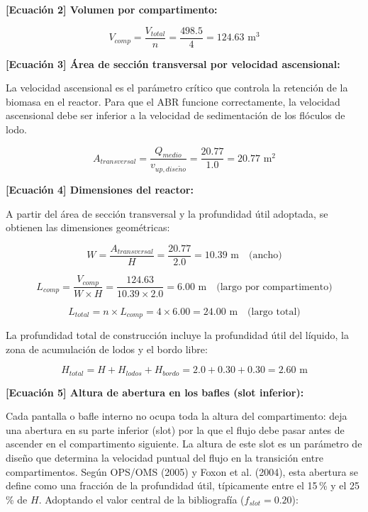 \documentclass[12pt,a4paper]{article}
\begin{document}
\textbf{[Ecuación 2] Volumen por compartimento:}

\begin{equation}
V_{comp} = \frac{V_{total}}{n} = \frac{498.5}{4} = 124.63 \text{ m}^3
\end{equation}

\textbf{[Ecuación 3] Área de sección transversal por velocidad ascensional:}

La velocidad ascensional es el parámetro crítico que controla la retención de la biomasa en el reactor. Para que el ABR funcione correctamente, la velocidad ascensional debe ser inferior a la velocidad de sedimentación de los flóculos de lodo.

\begin{equation}
A_{transversal} = \frac{Q_{medio}}{v_{up, dise\tilde{n}o}} = \frac{20.77}{1.0} = 20.77 \text{ m}^2
\end{equation}

\textbf{[Ecuación 4] Dimensiones del reactor:}

A partir del área de sección transversal y la profundidad útil adoptada, se obtienen las dimensiones geométricas:

\begin{equation}
W = \frac{A_{transversal}}{H} = \frac{20.77}{2.0} = 10.39 \text{ m} \quad \text{(ancho)}
\end{equation}

\begin{equation}
L_{comp} = \frac{V_{comp}}{W \times H} = \frac{124.63}{10.39 \times 2.0} = 6.00 \text{ m} \quad \text{(largo por compartimento)}
\end{equation}

\begin{equation}
L_{total} = n \times L_{comp} = 4 \times 6.00 = 24.00 \text{ m} \quad \text{(largo total)}
\end{equation}

La profundidad total de construcción incluye la profundidad útil del líquido, la zona de acumulación de lodos y el bordo libre:

\begin{equation}
H_{total} = H + H_{lodos} + H_{bordo} = 2.0 + 0.30 + 0.30 = 2.60 \text{ m}
\end{equation}

\textbf{[Ecuación 5] Altura de abertura en los bafles (slot inferior):}

Cada pantalla o bafle interno no ocupa toda la altura del compartimento: deja una abertura en su parte inferior (slot) por la que el flujo debe pasar antes de ascender en el compartimento siguiente. La altura de este slot es un parámetro de diseño que determina la velocidad puntual del flujo en la transición entre compartimentos. Según OPS/OMS (2005) y Foxon et al. (2004), esta abertura se define como una fracción de la profundidad útil, típicamente entre el 15\,\% y el 25\,\% de $H$. Adoptando el valor central de la bibliografía ($f_{slot} = 0.20$):
\end{document}
